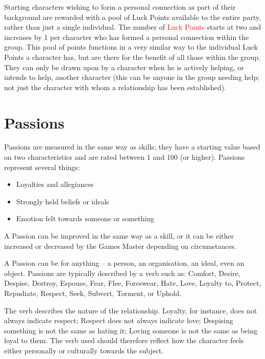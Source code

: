 \documentclass[10pt]{article}
\begin{document}
Starting characters wishing to form a personal connection as part of their background are rewarded with a pool of Luck Points available to the entire party, rather than just a single individual. The number of \textcolor{red}{Luck Points} starts at two and increases by 1 per character who has formed a personal connection within the group. This pool of points functions in a very similar way to the individual Luck Points a character has, but are there for the benefit of all those within the group. They can only be drawn upon by a character when he is actively helping, or intends to help, another character (this can be anyone in the group needing help; not just the character with whom a relationship has been established).


\section{Passions}
\label{sec:passions-detailed}
Passions are measured in the same way as skills; they have a starting value based on two characteristics and are rated between 1 and 100 (or higher). Passions represent several things:

\begin{itemize}
    \item Loyalties and allegiances
    \item Strongly held beliefs or ideals
    \item Emotion felt towards someone or something
\end{itemize}

A Passion can be improved in the same way as a skill, or it can be either increased or decreased by the Games Master depending on circumstances.

A Passion can be for anything – a person, an organisation, an ideal, even an object. Passions are typically described by a verb such as: Comfort, Desire, Despise, Destroy, Espouse, Fear, Flee, Foreswear, Hate, Love, Loyalty to, Protect, Repudiate, Respect, Seek, Subvert, Torment, or Uphold.

The verb describes the nature of the relationship. Loyalty, for instance, does not always indicate respect; Respect does not always indicate love; Despising something is not the same as hating it; Loving someone is not the same as being loyal to them. The verb used should therefore reflect how the character feels either personally or culturally towards the subject.
\end{document}
